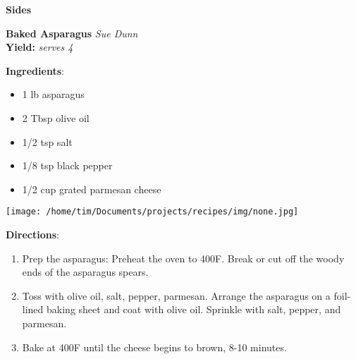 \documentclass[11pt, twoside, openany]{book}
\begin{document}
{\newpage \LARGE \textbf{Sides}} \label{sides}\vspace{4mm}\\
\noindent\begin{minipage}[t]{\linewidth}%
{\Large\textbf{Baked Asparagus}} \label{baked-asparagus}\hfill\textit{Sue Dunn}\\
\textbf{Yield:} \textit{serves 4}\\
\noindent\begin{minipage}[t]{0.78\linewidth}%
\textbf{Ingredients}:\vspace{-3mm}
\begin{multicols}{2}
\begin{itemize}\setlength\itemsep{-1mm}
\item 1 lb asparagus
\item 2 Tbsp olive oil
\item 1/2 tsp salt
\item 1/8 tsp black pepper
\item 1/2 cup grated parmesan cheese
\end{itemize}
\end{multicols}
\end{minipage}
\noindent\begin{minipage}[t]{0.18\linewidth}
\centering \strut\vspace*{-\baselineskip}\newline
\texttt{[image: /home/tim/Documents/projects/recipes/img/none.jpg]}\\
\end{minipage}\vspace{3mm}
\textbf{Directions}:
\vspace{-3mm}\begin{enumerate}\setlength\itemsep{-1mm}
\item Prep the asparagus: Preheat the oven to 400F. Break or cut off the woody ends of the asparagus spears.
\item Toss with olive oil, salt, pepper, parmesan. Arrange the asparagus on a foil-lined baking sheet and coat with olive oil. Sprinkle with salt, pepper, and parmesan.
\item Bake at 400F until the cheese begins to brown, 8-10 minutes.
\end{enumerate}
\end{minipage}\vspace{8mm}
\end{document}
